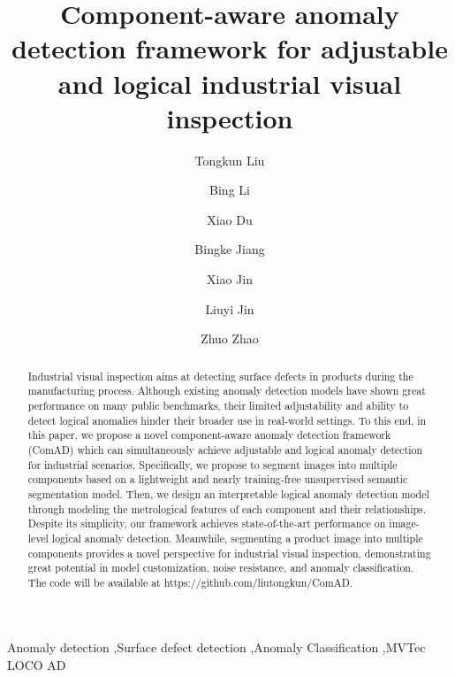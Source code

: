 \documentclass[final,5p,times,twocolumn]{elsarticle}
\begin{document}
\begin{frontmatter}




\title{Component-aware anomaly detection framework for adjustable and logical industrial visual inspection}



\author[Address1]{Tongkun Liu}
\author[Address1,Address2]{Bing Li}
\author[Address1]{Xiao Du}
\author[Address1]{Bingke Jiang}
\author[Address1]{Xiao Jin}
\author[Address1]{Liuyi Jin}
\author[Address1]{Zhuo Zhao}

\address[Address1]{State Key Laboratory for Manufacturing System Engineering, Xi’an Jiaotong University,No.99 Yanxiang Road, Yanta District, 710054, Xi’an, Shaanxi, China}


\address[Address2]{International Joint Research Laboratory for Micro/Nano Manufacturing and Measurement Technologies, Xi’an Jiaotong University,No.99 Yanxiang Road, Yanta District, 710054, Xi’an, Shaanxi, China}

          
\begin{abstract}
Industrial visual inspection aims at detecting surface defects in products during the manufacturing process. Although existing anomaly detection models have shown great performance on many public benchmarks, their limited adjustability and ability to detect logical anomalies hinder their broader use in real-world settings. To this end, in this paper, we propose a novel component-aware anomaly detection framework (ComAD) which can simultaneously achieve adjustable and logical anomaly detection for industrial scenarios. Specifically, we propose to segment images into multiple components based on a lightweight and nearly training-free unsupervised semantic segmentation model. Then, we design an interpretable logical anomaly detection model through modeling the metrological features of each component and their relationships. Despite its simplicity, our framework achieves state-of-the-art performance on image-level logical anomaly detection. Meanwhile, segmenting a product image into multiple components provides a novel perspective for industrial visual inspection, demonstrating great potential in model customization, noise resistance, and anomaly classification. The code will be available at https://github.com/liutongkun/ComAD. 

\end{abstract}







\begin{keyword}
Anomaly detection \sep Surface defect detection \sep Anomaly Classification \sep MVTec LOCO AD 




\end{keyword}

\end{frontmatter}
\end{document}
